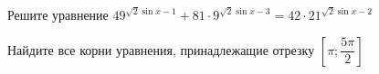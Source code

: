 \begin{ex}
	\begin{condition}
		\begin{enumcols}[label=\asbuk*)]
			\item Решите уравнение \( 49^{\sqrt{2}\sin x - 1 } + 81\cdot9^{\sqrt{2}\sin x - 3} = 42\cdot 21^{\sqrt{2}\sin x -2} \)
			\item Найдите все корни уравнения, принадлежащие отрезку \( \left[\pi;\dfrac{5\pi}{2}\right] \)
		\end{enumcols}
	\end{condition}
\end{ex}